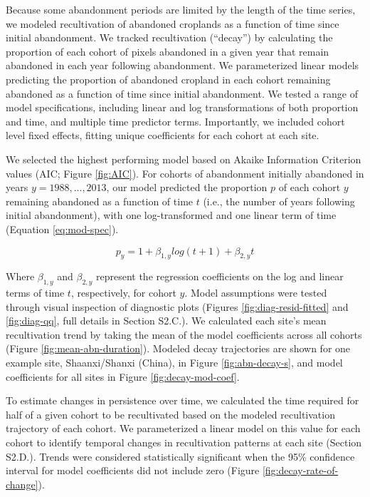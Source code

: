 \documentclass[9pt,twocolumn,twoside,lineno]{pnas-new}
\begin{document}
Because some abandonment periods are limited by the length of the time series, we modeled recultivation of abandoned croplands as a function of time since initial abandonment.
We tracked recultivation (``decay'') by calculating the proportion of each cohort of pixels abandoned in a given year that remain abandoned in each year following abandonment.
We parameterized linear models predicting the proportion of abandoned cropland in each cohort remaining abandoned as a function of time since initial abandonment.
We tested a range of model specifications, including linear and log transformations of both proportion and time, and multiple time predictor terms.
Importantly, we included cohort level fixed effects, fitting unique coefficients for each cohort at each site.

We selected the highest performing model based on Akaike Information Criterion values (AIC; Figure \ref{fig:AIC}).
For cohorts of abandonment initially abandoned in years \(y = 1988, ... , 2013\), our model predicted the proportion \(p\) of each cohort \(y\) remaining abandoned as a function of time \(t\) (i.e., the number of years following initial abandonment), with one log-transformed and one linear term of time (Equation \eqref{eq:mod-spec}).

\begin{equation}
p_{y} = 1 + \beta_{1,y} log(t + 1) + \beta_{2,y} t \label{eq:mod-spec}
\end{equation}

Where \(\beta_{1,y}\) and \(\beta_{2,y}\) represent the regression coefficients on the log and linear terms of time \(t\), respectively, for cohort \(y\).
Model assumptions were tested through visual inspection of diagnostic plots (Figures \ref{fig:diag-resid-fitted} and \ref{fig:diag-qq}, full details in Section S2.C.).
We calculated each site's mean recultivation trend by taking the mean of the model coefficients across all cohorts (Figure \ref{fig:mean-abn-duration}).
Modeled decay trajectories are shown for one example site, Shaanxi/Shanxi (China), in Figure \ref{fig:abn-decay-s}, and model coefficients for all sites in Figure \ref{fig:decay-mod-coef}.

To estimate changes in persistence over time, we calculated the time required for half of a given cohort to be recultivated based on the modeled recultivation trajectory of each cohort.
We parameterized a linear model on this value for each cohort to identify temporal changes in recultivation patterns at each site (Section S2.D.).
Trends were considered statistically significant when the 95\% confidence interval for model coefficients did not include zero (Figure \ref{fig:decay-rate-of-change}).
\end{document}
